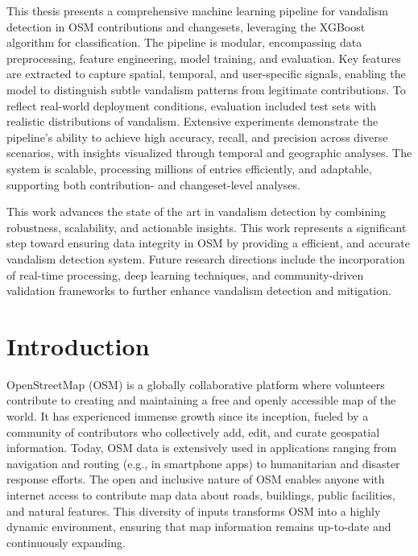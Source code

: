 \documentclass[
    13pt, %
    a4paper, %
    twoside, 
    DIV14, %
    listof=totoc, %
    bibliography=totoc, %
    index=totoc, %
    headsepline
]{scrreprt}
\begin{document}
This thesis presents a comprehensive machine learning pipeline for vandalism detection in OSM contributions and changesets, leveraging the XGBoost algorithm for classification. The pipeline is modular, encompassing data preprocessing, feature engineering, model training, and evaluation. Key features are extracted to capture spatial, temporal, and user-specific signals, enabling the model to distinguish subtle vandalism patterns from legitimate contributions. To reflect real-world deployment conditions, evaluation included test sets with realistic distributions of vandalism. Extensive experiments demonstrate the pipeline’s ability to achieve high accuracy, recall, and precision across diverse scenarios, with insights visualized through temporal and geographic analyses. The system is scalable, processing millions of entries efficiently, and adaptable, supporting both contribution- and changeset-level analyses.

This work advances the state of the art in vandalism detection by combining robustness, scalability, and actionable insights. This work represents a significant step toward ensuring data integrity in OSM by providing a efficient, and accurate vandalism detection system. Future research directions include the incorporation of real-time processing, deep learning techniques, and community-driven validation frameworks to further enhance vandalism detection and mitigation.

\newpage
\tableofcontents
\newpage

\setcounter{page}{1}


\chapter{Introduction}\label{intro}

OpenStreetMap (OSM) \cite{osm_home} is a globally collaborative platform where volunteers contribute to creating and maintaining a free and openly accessible map of the world. It has experienced immense growth since its inception, fueled by a community of contributors who collectively add, edit, and curate geospatial information. Today, OSM data is extensively used in applications ranging from navigation and routing (e.g., in smartphone apps) to humanitarian and disaster response efforts. The open and inclusive nature of OSM enables anyone with internet access to contribute map data about roads, buildings, public facilities, and natural features. This diversity of inputs transforms OSM into a highly dynamic environment, ensuring that map information remains up-to-date and continuously expanding.
\end{document}
